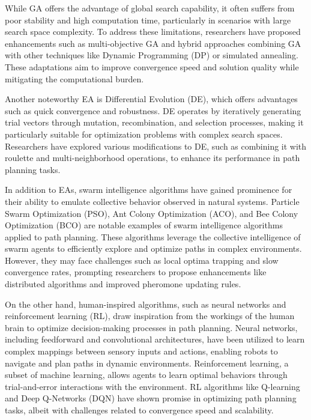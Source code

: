 \vspace*{6mm}


While GA offers the advantage of global search capability, it often suffers from poor stability and high computation time, particularly in scenarios with large search space complexity. To address these limitations, researchers have proposed enhancements such as multi-objective GA and hybrid approaches combining GA with other techniques like Dynamic Programming (DP) or simulated annealing. These adaptations aim to improve convergence speed and solution quality while mitigating the computational burden.

\vspace*{6mm}


Another noteworthy EA is Differential Evolution (DE), which offers advantages such as quick convergence and robustness. DE operates by iteratively generating trial vectors through mutation, recombination, and selection processes, making it particularly suitable for optimization problems with complex search spaces. Researchers have explored various modifications to DE, such as combining it with roulette and multi-neighborhood operations, to enhance its performance in path planning tasks.

\vspace*{6mm}


In addition to EAs, swarm intelligence algorithms have gained prominence for their ability to emulate collective behavior observed in natural systems. Particle Swarm Optimization (PSO), Ant Colony Optimization (ACO), and Bee Colony Optimization (BCO) are notable examples of swarm intelligence algorithms applied to path planning. These algorithms leverage the collective intelligence of swarm agents to efficiently explore and optimize paths in complex environments. However, they may face challenges such as local optima trapping and slow convergence rates, prompting researchers to propose enhancements like distributed algorithms and improved pheromone updating rules.

\vspace*{6mm}


On the other hand, human-inspired algorithms, such as neural networks and reinforcement learning (RL), draw inspiration from the workings of the human brain to optimize decision-making processes in path planning. Neural networks, including feedforward and convolutional architectures, have been utilized to learn complex mappings between sensory inputs and actions, enabling robots to navigate and plan paths in dynamic environments. Reinforcement learning, a subset of machine learning, allows agents to learn optimal behaviors through trial-and-error interactions with the environment. RL algorithms like Q-learning and Deep Q-Networks (DQN) have shown promise in optimizing path planning tasks, albeit with challenges related to convergence speed and scalability.

